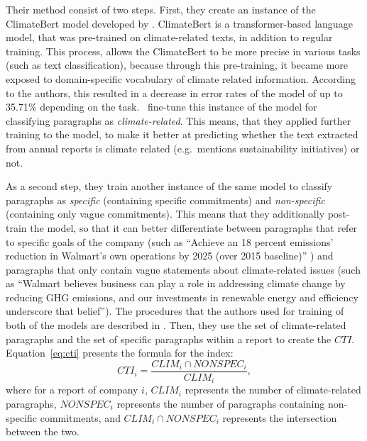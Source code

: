\documentclass[12pt]{article}
\begin{document}
Their method consist of two steps. First, they create an instance of the ClimateBert model developed by \textcite{webersinkeCLIMATEBERTPretrainedLanguage2022}. ClimateBert is a transformer-based language model, that was pre-trained on climate-related texts, in addition to regular training. This process, allows the ClimateBert to be more precise in various tasks (such as text classification), because through this pre-training, it became more exposed to domain-specific vocabulary of climate related information. According to the authors, this resulted in a decrease in error rates of the model of up to 35.71\% depending on the task.~\citeauthor{binglerHowCheapTalk2024} fine-tune this instance of the model for classifying paragraphs as \textit{climate-related}. This means, that they applied further training to the model, to make it better at predicting whether the text extracted from annual reports is climate related (e.g.~mentions sustainability initiatives) or not. 

As a second step, they train another instance of the same model to classify paragraphs as \textit{specific} (containing specific commitments) and \textit{non-specific} (containing only vague commitments). This means that they additionally post-train the model, so that it can better differentiate between paragraphs that refer to specific goals of the company (such as ``Achieve an 18 percent emissions' reduction in Walmart's own operations by 2025 (over 2015 baseline)'' \parencite{walmart2018csr}) and paragraphs that only contain vague statements about climate-related issues (such as ``Walmart believes business can play a role in addressing climate change by reducing GHG emissions, and our investments in renewable energy and efficiency underscore that belief''). The procedures that the authors used for training of both of the models are described in \textcite{binglerCheapTalkCherrypicking2022,binglerHowCheapTalk2024}. Then, they use the set of climate-related paragraphs and the set of specific paragraphs within a report to create the $CTI$. Equation~\ref{eq:cti} presents the formula for the index:
\begin{equation}\label{eq:cti}
    CTI_i = \frac{CLIM_i \cap NONSPEC_i}{CLIM_{i}},
\end{equation}
where for a report of company $i$, $CLIM_i$ represents the number of climate-related paragraphs, $NONSPEC_i$ represents the number of paragraphs containing non-specific commitments, and $CLIM_i \cap NONSPEC_i$ represents the intersection between the two. 
\end{document}
